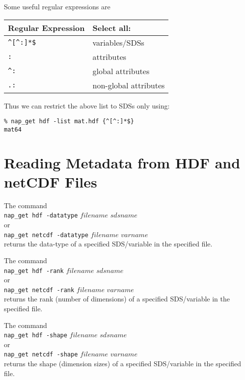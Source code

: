 Some useful regular expressions are

\begin{tabular}{|l|l|}
    \hline 
      \textbf{Regular Expression} & \textbf{Select all:}
    \\
    \hline 
    \hline 
        \verb/^[^:]*$/ & variables/SDSs
    \\
    \hline 
        \verb/:/ & attributes
    \\
    \hline 
        \verb/^:/ & global attributes
    \\
    \hline 
        \verb/.:/ & non-global attributes
    \\
  \hline
\end{tabular}

\vspace{1 mm}

Thus we can restrict the above list to SDSs only using:
  \begin{verbatim}
% nap_get hdf -list mat.hdf {^[^:]*$}
mat64
\end{verbatim}

\section{Reading Metadata from HDF and netCDF Files}
    \label{nap-get-Metadata}

The command
  \\
  \texttt{nap\_get hdf -datatype} 
  $\mathit{filename}$ $\mathit{sdsname}$
  \\or
  \\
  \texttt{nap\_get netcdf -datatype} 
  $\mathit{filename}$ $\mathit{varname}$
  \\returns the data-type of a specified SDS/variable in the
  specified file.
  

The command
  \\
  \texttt{nap\_get hdf -rank} 
  $\mathit{filename}$ $\mathit{sdsname}$
  \\or
  \\
  \texttt{nap\_get netcdf -rank} 
  $\mathit{filename}$ $\mathit{varname}$
  \\returns the rank (number of dimensions) of a specified
  SDS/variable in the specified file.
  

The command
  \\
  \texttt{nap\_get hdf -shape} 
  $\mathit{filename}$ $\mathit{sdsname}$
  \\or
  \\
  \texttt{nap\_get netcdf -shape} 
  $\mathit{filename}$ $\mathit{varname}$
  \\returns the shape (dimension sizes) of a specified SDS/variable
  in the specified file.
  

